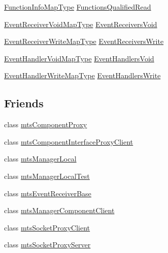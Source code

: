 \begin{DoxyCompactItemize}
\item 
\hyperlink{classmts_interface_required_a4c21eaf53811c5782bae6293904cffe5}{Function\+Info\+Map\+Type} \hyperlink{classmts_interface_required_abd2e0b70299b9a9a51cb7f3443d1364b}{Functions\+Qualified\+Read}
\item 
\hyperlink{classmts_interface_required_a4f0c15e3c51f635a969eb8706a55afb1}{Event\+Receiver\+Void\+Map\+Type} \hyperlink{classmts_interface_required_a88fa763c4f674eb5fdb5347e11532b4b}{Event\+Receivers\+Void}
\item 
\hyperlink{classmts_interface_required_a58a4a6a94697fbb23d2884cf6cbf2a0b}{Event\+Receiver\+Write\+Map\+Type} \hyperlink{classmts_interface_required_af63cf75357e16f0e1ae862d9abaadbe3}{Event\+Receivers\+Write}
\item 
\hyperlink{classmts_interface_required_a1f6cca73d8dffb794e3778092b375783}{Event\+Handler\+Void\+Map\+Type} \hyperlink{classmts_interface_required_a8bec1e9d553dbadde976ec4aee9d9dd0}{Event\+Handlers\+Void}
\item 
\hyperlink{classmts_interface_required_a8ea82ecaf05dc0aca4595ac685b8a43f}{Event\+Handler\+Write\+Map\+Type} \hyperlink{classmts_interface_required_a41c48795f94e27b82a6ace96a194f602}{Event\+Handlers\+Write}
\end{DoxyCompactItemize}
\subsection*{Friends}
\begin{DoxyCompactItemize}
\item 
class \hyperlink{classmts_interface_required_a744ae66bbeeeba6ef38e59a2dd5e9743}{mts\+Component\+Proxy}
\item 
class \hyperlink{classmts_interface_required_a18fd56a8a436d449d0b4cfd44835f821}{mts\+Component\+Interface\+Proxy\+Client}
\item 
class \hyperlink{classmts_interface_required_a31c1c611dbb103ac58ed40d84960baa0}{mts\+Manager\+Local}
\item 
class \hyperlink{classmts_interface_required_adc2ae8db48d5418c526f275aafa3d4a9}{mts\+Manager\+Local\+Test}
\item 
class \hyperlink{classmts_interface_required_a30ab6f7454e493cfaa5fe89319934c6a}{mts\+Event\+Receiver\+Base}
\item 
class \hyperlink{classmts_interface_required_abdd48306351388730b5025e062ae1069}{mts\+Manager\+Component\+Client}
\item 
class \hyperlink{classmts_interface_required_a29fb04198d83763f1d10ca5e03f2fa2f}{mts\+Socket\+Proxy\+Client}
\item 
class \hyperlink{classmts_interface_required_add2bf103c2ba9373d7a6cacccfe1046d}{mts\+Socket\+Proxy\+Server}
\end{DoxyCompactItemize}


